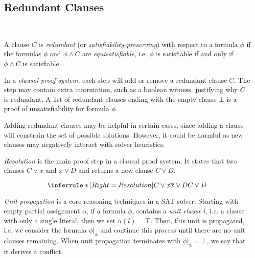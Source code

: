 \subsection{Redundant Clauses}~\label{subsec:redundant}

A clause $C$ is \emph{redundant} (or \emph{satisfiability-preserving}) with respect to a formula $\phi$ if the formulas $\phi$ and $\phi \land C$ are \emph{equisatisfiable}, i.e. $\phi$ is satisfiable if and only if $\phi \land C$ is satisfiable.

In a \emph{clausal proof system}, each step will add or remove a redundant clause $C$. The step may contain extra information, such as a boolean witness, justifying why $C$ is redundant. A list of redundant clauses ending with the empty clause $\bot$ is a proof of unsatisfiability for formula $\phi$.


Adding redundant clauses may be helpful in certain cases, since adding a clause will constrain the set of possible solutions. However, it could be harmful as new clauses may negatively interact with solver heuristics.


\emph{Resolution} is the main proof step in a clausal proof system. It states that two clauses $C \lor x$ and $\overline{x} \lor D$ and returns a new clause $C \lor D$.

\begin{equation*}
    \inferrule*[Right=Resolution]{
        C \lor x \\ \overline{x} \lor D
    }{
        C \lor D
    }    
\end{equation*}

\emph{Unit propagation} is a core reasoning techniques in a SAT solver. Starting with empty partial assignment $\alpha$, if a formula $\phi$, contains a \emph{unit clause} $l$, i.e. a clause with only a single literal, then we set $\alpha(l) = \top$. Then, this unit is propagated, i.e. we consider the formula $\phi|_\alpha$ and continue this process until there are no unit clauses remaining. When unit propagation terminates with $\phi|_\alpha = \bot$, we say that it derives a conflict.

